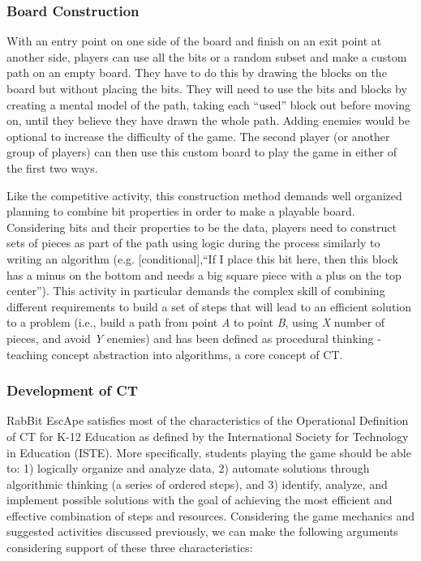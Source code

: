 \documentclass{acm_proc_article-sp}
\begin{document}
\subsubsection{Board Construction}
\label{sec:construction}
With an entry point on one side of the board and finish on an exit point at another side, players can use all the bits or a random subset and make a custom path on an empty board.
They have to do this by drawing the blocks on the board but without placing the bits.
They will need to use the bits and blocks by creating a mental model of the path, taking each ``used'' block out before moving on, until they believe they have drawn the whole path.
Adding enemies would be optional to increase the difficulty of the game.
The second player (or another group of players) can then use this custom board to play the game in either of the first two ways.

Like the competitive activity, this construction method demands well organized planning to combine bit properties in order to make a playable board.
Considering bits and their properties to be the data, players need to construct sets of pieces as part of the path using logic during the process similarly to writing an algorithm (e.g. [conditional],``If I place this bit here, then this block has a minus on the bottom and needs a big square piece with a plus on the top center'').
This activity in particular demands the complex skill of combining different requirements to build a set of steps that will lead to an efficient solution to a problem (i.e., build a path from point \textit{A} to point \textit{B}, using \textit{X} number of pieces, and avoid \textit{Y} enemies) and has been defined as procedural thinking - teaching concept abstraction into algorithms\cite{papert1980mindstorms}, a core concept of CT\cite{national2010report}.

\subsubsection{Development of CT}
\label{sec:developing_ct}
RabBit EscApe satisfies most of the characteristics of the Operational Definition of CT for K-12 Education as defined by the International Society for Technology in Education (ISTE)\cite{operationalct}. 
More specifically, students playing the game should be able to: 1) logically organize and analyze data, 2) automate solutions through algorithmic thinking (a series of ordered steps), and 3) identify, analyze, and implement possible solutions with the goal of achieving the most efficient and effective combination of steps and resources. 
Considering the game mechanics and suggested activities discussed previously, we can make the following arguments considering support of these three characteristics:
\end{document}
